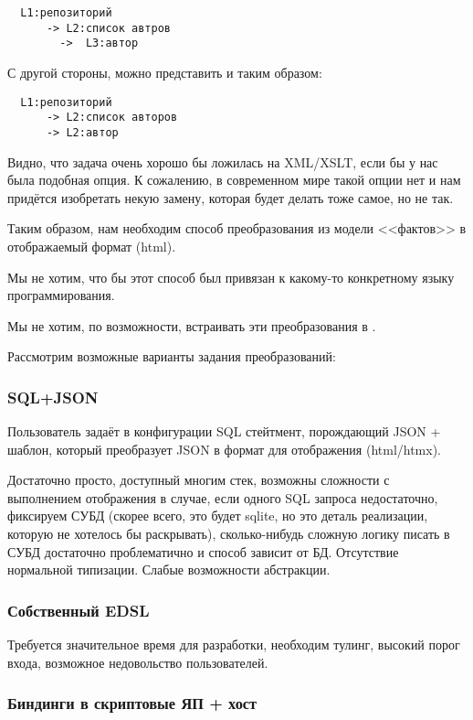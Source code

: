 \begin{verbatim}
  L1:репозиторий
      -> L2:список автров
        ->  L3:автор
\end{verbatim}

С другой стороны, можно представить и таким образом:

\begin{verbatim}
  L1:репозиторий
      -> L2:список авторов
      -> L2:автор
\end{verbatim}


Видно, что задача очень хорошо бы ложилась на XML/XSLT, если бы у нас
была подобная опция.  К сожалению, в современном мире такой опции нет
и нам придётся изобретать некую замену, которая будет делать тоже
самое, но не так.


Таким образом, нам необходим способ преобразования из модели
<<фактов>> в отображаемый формат (html).

Мы не хотим, что бы этот способ был привязан к какому-то конкретному
языку программирования.

Мы не хотим, по возможности, встраивать эти преобразования в
.


Рассмотрим возможные варианты задания преобразований:

\subsubsection{SQL+JSON}

Пользователь задаёт в конфигурации SQL стейтмент, порождающий JSON +
шаблон, который преобразует JSON в формат для отображения (html/htmx).

Достаточно просто, доступный многим стек, возможны сложности с
выполнением отображения в случае, если одного SQL запроса
недостаточно, фиксируем СУБД (скорее всего, это будет sqlite, но это
деталь реализации, которую не хотелось бы раскрывать), сколько-нибудь
сложную логику писать в СУБД достаточно проблематично и способ зависит
от БД. Отсутствие нормальной типизации. Слабые возможности абстракции.


\subsubsection{Собственный EDSL}

Требуется значительное время для разработки, необходим тулинг,
высокий порог входа, возможное недовольство пользователей.


\subsubsection{Биндинги в скриптовые ЯП + хост}

